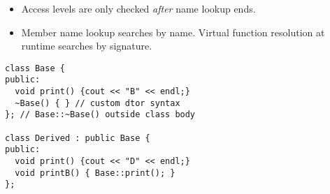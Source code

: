 \documentclass[7pt, twocolumn]{extarticle}
\begin{document}
\begin{small}
\begin{minipage}[h]{5.8cm}
\smallskip
\begin{itemize}[leftmargin=*,align=parleft]
\setlength\itemsep{0pt}
\item[\textcolor{info}{{\faInfoCircle}}] Access levels are only checked \textit{after} name lookup ends.
\item[\textcolor{info}{{\faInfoCircle}}] Member name lookup searches by name. Virtual function resolution at runtime searches by signature.
\end{itemize}

   \end{minipage}
   \hspace{0pt}
   \begin{minipage}[h]{4.4cm}
   \begin{tcolorbox}[top=-5pt,bottom=-5pt,middle=-5pt,left=-1pt,right=-1pt,boxrule=0.5pt,arc=0pt]
              {
              \begin{lstlisting}[style = mystyle]
class Base {
public:
  void print() {cout << "B" << endl;}
  ~Base() { } // custom dtor syntax 
}; // Base::~Base() outside class body

class Derived : public Base {
public:
  void print() {cout << "D" << endl;}
  void printB() { Base::print(); }
};


\end{lstlisting}}
\end{tcolorbox}
\end{minipage}
\end{small}
\end{document}
